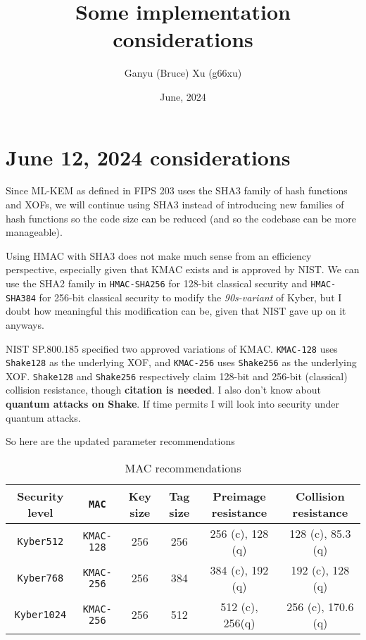 \documentclass{article}
\title{Some implementation considerations}
\author{Ganyu (Bruce) Xu (g66xu)}
\date{June, 2024}
\newcommand{\monospace}{\texttt}
\begin{document}
\maketitle

\section{June 12, 2024 considerations}
Since ML-KEM as defined in FIPS 203 uses the SHA3 family of hash functions and XOFs, we will continue using SHA3 instead of introducing new families of hash functions so the code size can be reduced (and so the codebase can be more manageable).

Using HMAC with SHA3 does not make much sense from an efficiency perspective, especially given that KMAC exists and is approved by NIST\cite{kelsey2016sha}. We can use the SHA2 family in \monospace{HMAC-SHA256} for 128-bit classical security and \monospace{HMAC-SHA384} for 256-bit classical security to modify the \textit{90s-variant} of Kyber, but I doubt how meaningful this modification can be, given that NIST gave up on it anyways.

NIST SP.800.185\cite{kelsey2016sha} specified two approved variations of KMAC. \monospace{KMAC-128} uses \monospace{Shake128} as the underlying XOF, and \monospace{KMAC-256} uses \monospace{Shake256} as the underlying XOF. \monospace{Shake128} and \monospace{Shake256} respectively claim 128-bit and 256-bit (classical) collision resistance, though \textbf{citation is needed}. I also don't know about \textbf{quantum attacks on Shake}. If time permits I will look into security under quantum attacks.

So here are the updated parameter recommendations

\begin{table}[h]
    \begin{center}
        \begin{tabular}{c|c|c|c|c|c}
            Security level 
                & \monospace{MAC} 
                & Key size
                & Tag size
                & Preimage resistance
                & Collision resistance \\
                \hline
            \monospace{Kyber512}
                & \monospace{KMAC-128}
                & 256
                & 256
                & 256 (c), 128 (q)
                & 128 (c), 85.3 (q) \\
                \hline
            \monospace{Kyber768}
                & \monospace{KMAC-256}
                & 256
                & 384
                & 384 (c), 192 (q)
                & 192 (c), 128 (q) \\
                \hline
            \monospace{Kyber1024}
                & \monospace{KMAC-256}
                & 256
                & 512
                & 512 (c), 256(q)
                & 256 (c), 170.6 (q) \\
                \hline
        \end{tabular}
    \end{center}
    \caption{MAC recommendations}
\end{table}
\end{document}
